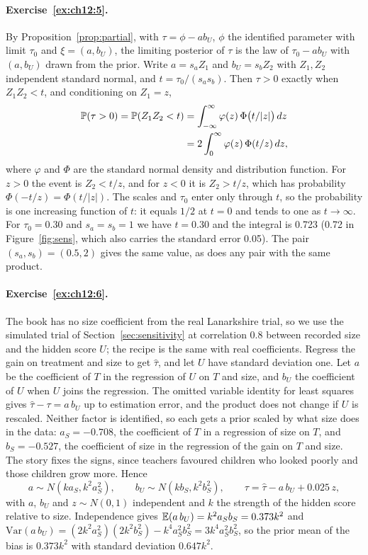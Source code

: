 \paragraph{Exercise~\ref{ex:ch12:5}.} By Proposition~\ref{prop:partial}, with $\tau = \phi - ab_U$, $\phi$ the identified parameter with limit $\tau_0$ and $\xi = (a, b_U)$, the limiting posterior of $\tau$ is the law of $\tau_0 - a b_U$ with $(a, b_U)$ drawn from the prior. Write $a = s_a Z_1$ and $b_U = s_b Z_2$ with $Z_1, Z_2$ independent standard normal, and $t = \tau_0/(s_a s_b)$. Then $\tau > 0$ exactly when $Z_1 Z_2 < t$, and conditioning on $Z_1 = z$,
\begin{align*}
\mathbb{P}(\tau > 0) = \mathbb{P}(Z_1 Z_2 < t) &= \int_{-\infty}^{\infty} \varphi(z)\,\Phi\bigl(t/|z|\bigr)\,dz \\
&= 2\int_0^\infty \varphi(z)\,\Phi(t/z)\,dz,
\end{align*}
where $\varphi$ and $\Phi$ are the standard normal density and distribution function. For $z > 0$ the event is $Z_2 < t/z$, and for $z < 0$ it is $Z_2 > t/z$, which has probability $\Phi(-t/z) = \Phi(t/|z|)$. The scales and $\tau_0$ enter only through $t$, so the probability is one increasing function of $t$: it equals $1/2$ at $t = 0$ and tends to one as $t \to \infty$. For $\tau_0 = 0.30$ and $s_a = s_b = 1$ we have $t = 0.30$ and the integral is 0.723 (0.72 in Figure~\ref{fig:sens}, which also carries the standard error 0.05). The pair $(s_a, s_b) = (0.5, 2)$ gives the same value, as does any pair with the same product.

\paragraph{Exercise~\ref{ex:ch12:6}.} The book has no size coefficient from the real Lanarkshire trial, so we use the simulated trial of Section~\ref{sec:sensitivity} at correlation 0.8 between recorded size and the hidden score $U$; the recipe is the same with real coefficients. Regress the gain on treatment and size to get $\hat\tau$, and let $U$ have standard deviation one. Let $a$ be the coefficient of $T$ in the regression of $U$ on $T$ and size, and $b_U$ the coefficient of $U$ when $U$ joins the regression. The omitted variable identity for least squares gives $\hat\tau - \tau = a\,b_U$ up to estimation error, and the product does not change if $U$ is rescaled. Neither factor is identified, so each gets a prior scaled by what size does in the data: $a_S = -0.708$, the coefficient of $T$ in a regression of size on $T$, and $b_S = -0.527$, the coefficient of size in the regression of the gain on $T$ and size. The story fixes the signs, since teachers favoured children who looked poorly and those children grow more. Hence
\[
a \sim N(k a_S, k^2a_S^2), \qquad b_U \sim N(k b_S, k^2b_S^2), \qquad \tau = \hat\tau - a\,b_U + 0.025\,z,
\]
with $a$, $b_U$ and $z \sim N(0, 1)$ independent and $k$ the strength of the hidden score relative to size. Independence gives $\mathbb{E}(a\,b_U) = k^2a_Sb_S = 0.373k^2$ and $\mathrm{Var}(a\,b_U) = (2k^2a_S^2)(2k^2b_S^2) - k^4a_S^2b_S^2 = 3k^4a_S^2b_S^2$, so the prior mean of the bias is $0.373k^2$ with standard deviation $0.647k^2$.


